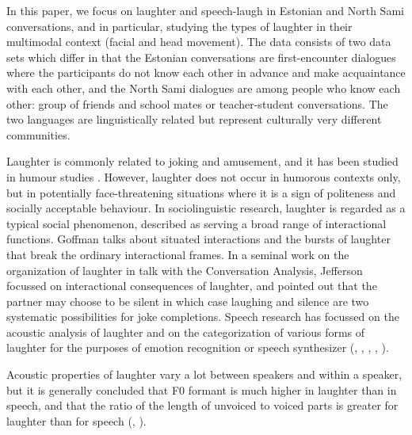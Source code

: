 \documentclass[10pt,journal,compsoc]{IEEEtran}
\begin{document}

In this paper, we focus on laughter and speech-laugh in Estonian and North Sami conversations, and in particular, studying the types of laughter in their multimodal context (facial and head movement). The data consists of two data sets which differ in that the Estonian conversations are first-encounter dialogues where the participants do not know each other in advance and make acquaintance with each other, and the North Sami dialogues are among people who know each other: group of friends and school mates or teacher-student conversations. The two languages are linguistically related but represent culturally very different communities.

Laughter is commonly related to joking and amusement, and it has been studied in humour studies \cite{Chafe:07}. However, laughter does not occur in humorous contexts only, but in potentially face-threatening situations where it is a sign of politeness and socially acceptable behaviour. In sociolinguistic research, laughter is regarded as a typical social phenomenon, described as serving a broad range of interactional functions. Goffman \cite{Goffman:74} talks about situated interactions and the bursts of laughter that break the ordinary interactional frames. In a seminal work on the organization of laughter in talk with the Conversation Analysis, Jefferson \cite{Jefferson:84} focussed on interactional consequences of laughter, and pointed out that the partner may choose to be silent in which case laughing and silence are two systematic possibilities for joke completions. Speech research has focussed on the acoustic analysis of laughter and on the categorization of various forms of laughter for the purposes of emotion recognition or speech synthesizer (\cite{Trouvain:03}, \cite{Truong:vanLeeuwen:07}, \cite{Owren:Bachorowski:07}, \cite{Bachorowski:ea:01}, \cite{Tanaka:Campbell:11}).

Acoustic properties of laughter vary a lot between speakers and within a speaker, but it is generally concluded that F0 formant is much higher in laughter than in speech, and that the ratio of the length of unvoiced to voiced parts is greater for laughter than for speech (\cite{Bachorowski:ea:01}, \cite{Truong:vanLeeuwen:07}).
\end{document}
